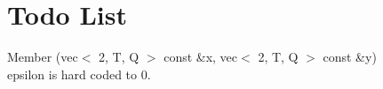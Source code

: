 \chapter{Todo List}
\hypertarget{todo}{}\label{todo}

\begin{DoxyRefList}
\item[Member \doxylink{group__gtx__vector__angle_ga9556a803dce87fe0f42fdabe4ebba1d5}{glm\+::oriented\+Angle} (vec$<$ 2, T, Q $>$ const \&x, vec$<$ 2, T, Q $>$ const \&y)]\hfill \\
\label{todo__todo000001}%
%
epsilon is hard coded to 0. 
\end{DoxyRefList}